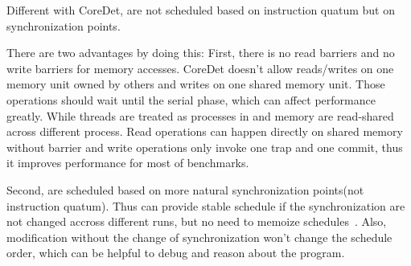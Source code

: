 Different with CoreDet, \dthreads{} are not scheduled based on instruction quatum 
but on synchronization points.  

There are two advantages by doing this:
First, there is no read barriers and no write barriers for memory accesses. 
CoreDet doesn't allow reads/writes on one memory unit owned by others and writes on one shared memory unit.
Those operations should wait until the serial phase, which can affect performance greatly. 
While threads are treated as processes in \dthreads{} and memory are read-shared across different process. 
Read operations can happen directly on shared memory without barrier and write operations only invoke one 
trap and one commit, thus it improves performance for most of benchmarks. 

Second, \dthreads{} are scheduled based on more natural synchronization points(not instruction quatum).
Thus \dthreads{} can provide stable schedule if the synchronization are not changed accross different runs, but 
no need to memoize schedules~\cite{stable-deterministic}.
Also, modification without the change of synchronization won't change the schedule order, which can be helpful to debug 
and reason about the program.





